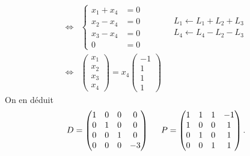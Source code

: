 \begin{align*}
\begin{aligned}
   \end{aligned}
\\
  \Leftrightarrow
  &\left\lbrace
  \begin{aligned}
    x_1       + x_4 &= 0\\
       x_2    - x_4 &= 0\\
          x_3 - x_4 &= 0 \\
                 0  &= 0
  \end{aligned}
  \right.   &\begin{aligned}
     L_1 \leftarrow L_1 + L_2 + L_3 \\
     L_4 \leftarrow L_4 - L_2 -L_3 
   \end{aligned}\\
 \Leftrightarrow
  &\begin{pmatrix}
    x_1 \\ x_2 \\ x_3 \\ x_4 
  \end{pmatrix}
  = x_4
  \begin{pmatrix}
    -1 \\ 1 \\ 1 \\ 1
  \end{pmatrix}
\
\end{align*}
On en déduit
\[
  D=
  \begin{pmatrix}
    1 & 0 & 0 & 0\\ 0 & 1 & 0 & 0 \\ 0 & 0 & 1 & 0 \\ 0 & 0 & 0 & -3 
  \end{pmatrix}\hspace{0.5cm}
P = \begin{pmatrix}
       1 & 1 & 1 & -1\\ 1 & 0 & 0 & 1 \\ 0 & 1 & 0 & 1 \\ 0 & 0 & 1 & 1
    \end{pmatrix}.
\]


